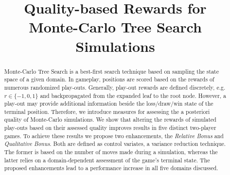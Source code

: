 \documentclass{ecai2014}
\begin{document}
\title{Quality-based Rewards for \\ Monte-Carlo Tree Search Simulations}


\maketitle


\begin{abstract}
Monte-Carlo Tree Search is a best-first search technique based on sampling the state space of a given domain. In gameplay, positions are scored based on the rewards of numerous randomized play-outs. Generally, play-out rewards are defined discretely, e.g. $r \in \{-1, 0, 1\}$ and backpropagated from the expanded leaf to the root node. However, a play-out may provide additional information beside the loss/draw/win state of the terminal position. Therefore, we introduce measures for assessing the a posteriori quality of Monte-Carlo simulations. We show that altering the rewards of simulated play-outs based on their assessed quality improves results in five distinct two-player games. To achieve these results we propose two enhancements, the \emph{Relative Bonus} and \emph{Qualitative Bonus}. Both are defined as control variates, a variance reduction technique. The former is based on the number of moves made during a simulation, whereas the latter relies on a domain-dependent assessment of the game's terminal state. The proposed enhancements lead to a performance increase in all five domains discussed.
\end{abstract}

\end{document}
